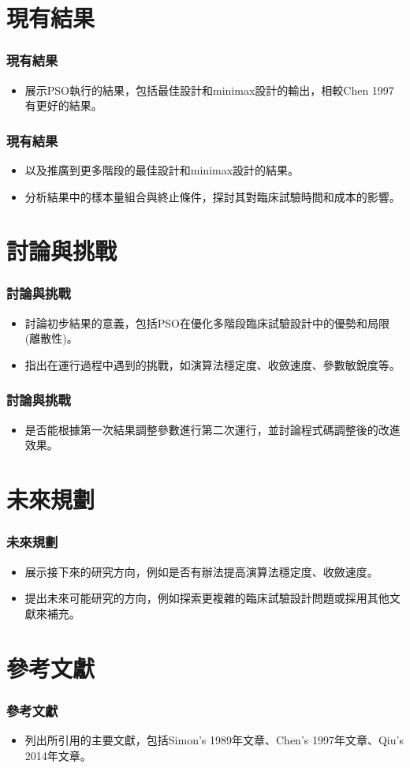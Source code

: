 \documentclass[xcolor=red]{beamer}
\begin{document}
\section{現有結果}
\begin{frame}
\frametitle{現有結果}
\begin{itemize}
\item 展示PSO執行的結果，包括最佳設計和minimax設計的輸出，相較Chen 1997 有更好的結果。
\end{itemize}
\end{frame}

\begin{frame}
\frametitle{現有結果}
\begin{itemize}
\item 以及推廣到更多階段的最佳設計和minimax設計的結果。
\item 分析結果中的樣本量組合與終止條件，探討其對臨床試驗時間和成本的影響。
\end{itemize}
\end{frame}

\section{討論與挑戰}
\begin{frame}
\frametitle{討論與挑戰}
\begin{itemize}
\item 討論初步結果的意義，包括PSO在優化多階段臨床試驗設計中的優勢和局限(離散性)。
\item 指出在運行過程中遇到的挑戰，如演算法穩定度、收斂速度、參數敏銳度等。
\end{itemize}
\end{frame}

\begin{frame}
\frametitle{討論與挑戰}
\begin{itemize}
\item 是否能根據第一次結果調整參數進行第二次運行，並討論程式碼調整後的改進效果。
\end{itemize}
\end{frame}

\section{未來規劃}
\begin{frame}
\frametitle{未來規劃}
\begin{itemize}
\item 展示接下來的研究方向，例如是否有辦法提高演算法穩定度、收斂速度。
\item 提出未來可能研究的方向，例如探索更複雜的臨床試驗設計問題或採用其他文獻來補充。
\end{itemize}
\end{frame}

\section{參考文獻}
\begin{frame}
\frametitle{參考文獻}
\begin{itemize}
\item 列出所引用的主要文獻，包括Simon's 1989年文章、Chen's 1997年文章、Qiu's 2014年文章。
\end{itemize}
\end{frame}
\end{document}
